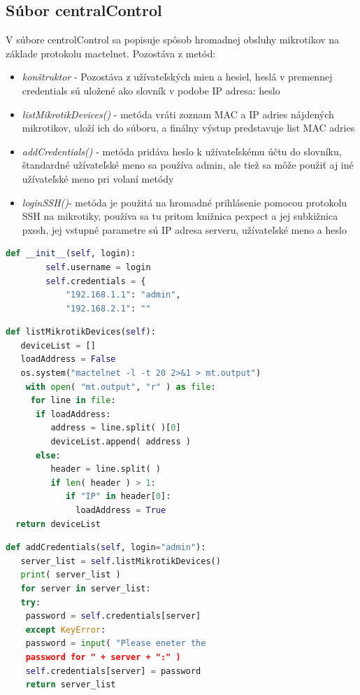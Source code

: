 \subsection{Súbor centralControl}
\label{sec:central}
V súbore centrolControl sa popisuje spôsob hromadnej obsluhy mikrotikov na základe protokolu mactelnet. Pozostáva z metód:
\begin{itemize}
\item \textit{konštruktor} - Pozostáva z užívateľských mien a hesiel, heslá v premennej credentials sú uložené ako slovník v podobe IP adresa: heslo
\item \textit{listMikrotikDevices()} - metóda vráti zoznam MAC a IP adries nájdených mikrotikov, uloží ich do súboru, a finálny výstup predstavuje list MAC adries
\item \textit{addCredentials()} - metóda pridáva heslo k užívateľskému účtu do slovníku, štandardné užívateľské meno sa používa admin, ale tiež sa môže použiť aj iné užívateľské meno pri volaní metódy
\item \textit{loginSSH()}- metóda je použitá na hromadné prihlásenie pomocou protokolu SSH na mikrotiky, používa sa tu pritom knižnica pexpect a jej subkižnica pxssh, jej vstupné parametre sú IP adresa serveru, užívateľské meno a heslo 
\end{itemize}
\linebreak
\begin{lstlisting}[language=python, frame=single, caption=Deklarácia vstupných parametrov,captionpos=b, basicstyle=\footnotesize]
 def __init__(self, login):
        self.username = login
        self.credentials = {
            "192.168.1.1": "admin",
            "192.168.2.1": ""
\end{lstlisting}
\begin{lstlisting}[language=python, frame=single, caption=Meóda zobrazenia mikrotikov,captionpos=b, showstringspaces=false, basicstyle=\footnotesize]
 def listMikrotikDevices(self):
   deviceList = []
   loadAddress = False
   os.system("mactelnet -l -t 20 2>&1 > mt.output")
    with open( "mt.output", "r" ) as file:
     for line in file:
      if loadAddress:
         address = line.split( )[0]
         deviceList.append( address )
      else:
         header = line.split( )
         if len( header ) > 1:
            if "IP" in header[0]:
              loadAddress = True
  return deviceList
\end{lstlisting}
\newpage
\begin{lstlisting}[language=python, frame=single, caption=Metóda pridania užívateľských mien a hesiel,captionpos=b, showstringspaces=false, basicstyle=\footnotesize]
 def addCredentials(self, login="admin"):
   server_list = self.listMikrotikDevices()
   print( server_list )
   for server in server_list:
   try:
    password = self.credentials[server]
    except KeyError:
    password = input( "Please eneter the 
    password for " + server + ":" )
    self.credentials[server] = password
    return server_list
\end{lstlisting}
